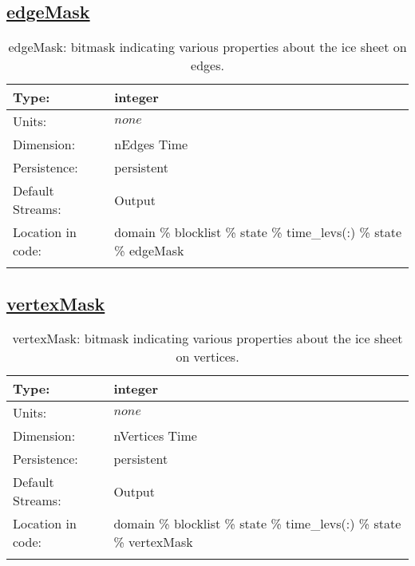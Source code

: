 \subsection[edgeMask]{\hyperref[sec:var_tab_state]{edgeMask}}
\label{subsec:var_sec_state_edgeMask}
\begin{center}
\begin{longtable}{| p{2.0in} | p{4.0in} |}
        \hline 
        Type: & integer \\
        \hline 
        Units: & $none$ \\
        \hline 
        Dimension: & nEdges Time \\
        \hline 
        Persistence: & persistent \\
        \hline 
		 Default Streams: & Output  \\
        \hline 
		 Location in code: & domain \% blocklist \% state \% time\_levs(:) \% state \% edgeMask \\
		 \hline 
    \caption{edgeMask: bitmask indicating various properties about the ice sheet on edges.}
\end{longtable}
\end{center}
\subsection[vertexMask]{\hyperref[sec:var_tab_state]{vertexMask}}
\label{subsec:var_sec_state_vertexMask}
\begin{center}
\begin{longtable}{| p{2.0in} | p{4.0in} |}
        \hline 
        Type: & integer \\
        \hline 
        Units: & $none$ \\
        \hline 
        Dimension: & nVertices Time \\
        \hline 
        Persistence: & persistent \\
        \hline 
		 Default Streams: & Output  \\
        \hline 
		 Location in code: & domain \% blocklist \% state \% time\_levs(:) \% state \% vertexMask \\
		 \hline 
    \caption{vertexMask: bitmask indicating various properties about the ice sheet on vertices.}
\end{longtable}
\end{center}
